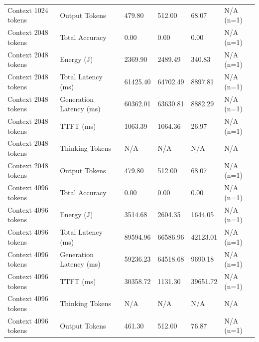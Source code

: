 \begin{table}
\begin{tabular}{llllll}
Context 1024 tokens & Output Tokens & 479.80 & 512.00 & 68.07 & N/A (n=1) \\
Context 2048 tokens & Total Accuracy & 0.00 & 0.00 & 0.00 & N/A (n=1) \\
Context 2048 tokens & Energy (J) & 2369.90 & 2489.49 & 340.83 & N/A (n=1) \\
Context 2048 tokens & Total Latency (ms) & 61425.40 & 64702.49 & 8897.81 & N/A (n=1) \\
Context 2048 tokens & Generation Latency (ms) & 60362.01 & 63630.81 & 8882.29 & N/A (n=1) \\
Context 2048 tokens & TTFT (ms) & 1063.39 & 1064.36 & 26.97 & N/A (n=1) \\
Context 2048 tokens & Thinking Tokens & N/A & N/A & N/A & N/A \\
Context 2048 tokens & Output Tokens & 479.80 & 512.00 & 68.07 & N/A (n=1) \\
Context 4096 tokens & Total Accuracy & 0.00 & 0.00 & 0.00 & N/A (n=1) \\
Context 4096 tokens & Energy (J) & 3514.68 & 2604.35 & 1644.05 & N/A (n=1) \\
Context 4096 tokens & Total Latency (ms) & 89594.96 & 66586.96 & 42123.01 & N/A (n=1) \\
Context 4096 tokens & Generation Latency (ms) & 59236.23 & 64518.68 & 9690.18 & N/A (n=1) \\
Context 4096 tokens & TTFT (ms) & 30358.72 & 1131.30 & 39651.72 & N/A (n=1) \\
Context 4096 tokens & Thinking Tokens & N/A & N/A & N/A & N/A \\
Context 4096 tokens & Output Tokens & 461.30 & 512.00 & 76.87 & N/A (n=1) \\
\bottomrule
\end{tabular}
\end{table}
